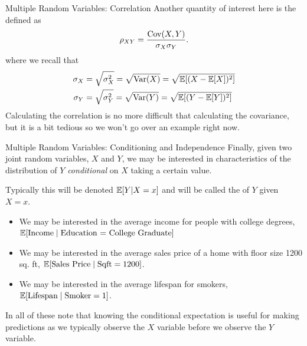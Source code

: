 \documentclass[notheorems,9pt, handout]{beamer}
\begin{document}
\begin{frame}{Multiple Random Variables: Correlation} 
	\label{frame:mrv-correlation}
	Another quantity of interest here is the  defined as 
	\[
		\rho_{XY} = \frac{\operatorname{Cov}(X,Y)}{\sigma_X\sigma_Y} 
	.\] 
	where we recall that
	\begin{align*}
		\sigma_X &= \sqrt{\sigma_X^2} = \sqrt{\operatorname{Var}(X)} = \sqrt{\mathbb{E}[(X-\mathbb{E}[X])^2]} \\
		\sigma_Y &= \sqrt{\sigma_Y^2} = \sqrt{\operatorname{Var}(Y)} = \sqrt{\mathbb{E}[(Y-\mathbb{E}[Y])^2]}
	\end{align*}
	\onslide<2->
	Calculating the correlation is no more difficult that calculating the covariance, but it is a bit tedious so we won't go over an example right now. 
\end{frame}
\begin{frame}{Multiple Random Variables: Conditioning and Independence} 
	\label{frame:mrv-conditioning}
	Finally, given two joint random variables, \(X\) and \(Y\), we may be interested in characteristics of the distribution of \(Y\) \emph{conditional} on \(X\) taking a certain value. 

	Typically this will be denoted \(\mathbb{E}[Y|X=x]\) and will be called the  of \(Y\) given \(X=x\).
	\onslide<2->
	\begin{itemize}
		\item<2-> We may be interested in the average income for people with college degrees, \(\mathbb{E}[\text{Income} \mid \text{Education = College Graduate}]\)
		\item<3-> We may be interested in the average sales price of a home with floor size 1200 sq. ft, \(\mathbb{E}[\text{Sales Price}\mid\text{Sqft} = 1200]\).
		\item<4-> We may be interested in the average lifespan for smokers, \(\mathbb{E}[\text{Lifespan}\mid\text{Smoker}=1]\).
	\end{itemize}
	In all of these note that knowing the conditional expectation is useful for making predictions as we typically observe the \(X\) variable before we observe the \(Y\) variable.
\end{frame}
\end{document}

